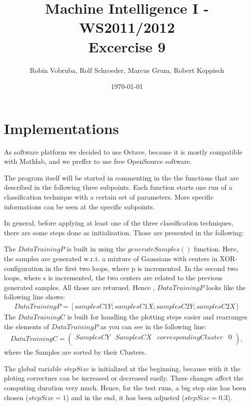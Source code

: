 \documentclass[a4paper,headings=small]{scrartcl}
\title{Machine Intelligence I - WS2011/2012\\Excercise 9}
\author{Robin Vobruba, Rolf Schroeder, Marcus Grum, Robert Koppisch}
\date{\today}
\begin{document}
\maketitle

\section{Implementations}
As software platform we decided to use Octave,
because it is mostly compatible with Mathlab,
and we preffer to use free OpenSource software.

The program itself will be started in commenting in the the functions
that are described in the following three subpoints.
Each function starts one run of a classification technique with a certain set of parameters.
More specific informations can be seen at the specific subpoints.

In general, before applying at least one of the three classification techniques,
there are some steps done as initialisation. Those are presented in the following:

The $DataTrainingP$ is built in using the $generateSamples()$ function.
Here, the samples are generated w.r.t. a mixture of Gaussians with centers in XOR-configuration
in the first two loops, where p is incremented.
In the second two loops, where s is incremented, the two centers are related to the previous generated samples.
All those are returned. Hence , $DataTrainingP$ looks like the following line shows:
\begin{align}
DataTrainingP = [samplesC1Y; samplesC1X; samplesC2Y; samplesC2X]
\end{align}
The $DataTrainingC$ is built for handling the plotting steps easier and rearranges the elements
of $DataTrainingP$ as you can see in the following line:
\begin{align}
DataTrainingC = 
\left(
\begin{array}{cccc}
	SamplesCY & SamplesCX & corresponding Cluster	& 0\\
\end{array}
\right),
\end{align} where the Samples are sorted by their Clusters.

The global variable $stepSize$ is initialized at the beginning,
because with it the ploting correctnes can be increased or decreased easily.
These changes affect the computing duration very much.
Hence, for the test runs, a big step size has been chosen ($stepSize = 1$) and in the end, it has been adjusted ($stepSize = 0.3$).
\end{document}
